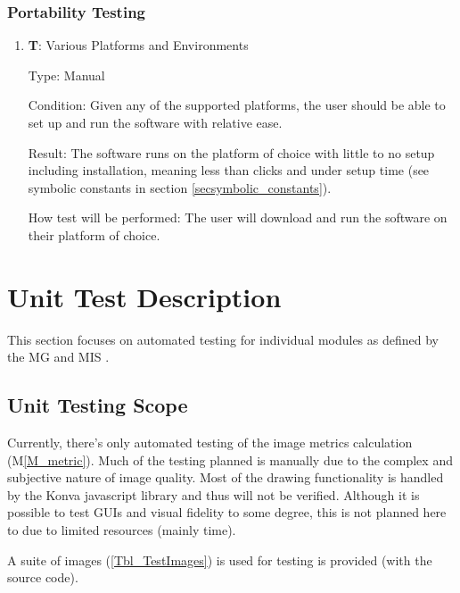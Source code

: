 \documentclass[12pt, titlepage]{article}
\newcommand{\mref}[1]{M\ref{#1}}
\newcounter{testnum} %
\begin{document}
\subsubsection{Portability Testing}
\begin{enumerate}

  \item{\textbf{T\thetestnum \label{T_portability}}: Various Platforms and Environments\\}

  Type: Manual
            
  Condition: Given any of the supported platforms, the user should be able to set up and 
    run the software with relative ease.
            
  Result: The software runs on the platform of choice with little to no setup including 
    installation, meaning less than 
    clicks and under 
    setup time (see symbolic constants in section \ref{secsymbolic_constants}).
            
  How test will be performed: The user will download and run the software on their
    platform of choice.
  
\end{enumerate}



\section{Unit Test Description} \label{sec_unittest}

This section focuses on automated testing for individual modules as defined by the
MG \cite{MG} and MIS \cite{MIS}. 

\subsection{Unit Testing Scope} \label{sec_unittest_scope}

Currently, there's only automated testing of the image metrics calculation (\mref{M_metric}).
Much of the testing planned is manually due to the complex and subjective nature of 
image quality. 
Most of the drawing functionality is handled by the Konva javascript library \cite{konva_2021}
and thus will not be verified.
Although it is possible to test GUIs and visual fidelity to some degree, this
is not planned here to due to limited resources (mainly time).

A suite of images (\ref{Tbl_TestImages}) is used for testing is provided (with the source code).
\end{document}
